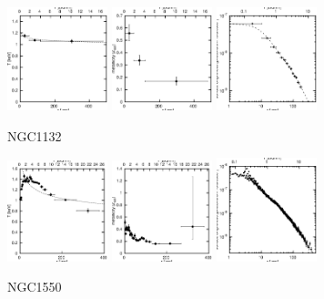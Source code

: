\documentclass[structabstract]{aa}
\begin{document}
\begin{figure}[h]
   \centering
   \includegraphics[width=0.26\textwidth]{tprofile_ngc1132.eps}
   \includegraphics[width=0.26\textwidth]{zprofile_ngc1132.eps}
   \includegraphics[width=0.26\textwidth]{sbps_ngc1132.eps}
  \caption{NGC1132}
   \label{fig:tprofngc1132}%
\end{figure}
\clearpage
\begin{figure}[h]
   \centering
   \includegraphics[width=0.26\textwidth]{tprofile_ngc1550.eps}
   \includegraphics[width=0.26\textwidth]{zprofile_ngc1550.eps}
   \includegraphics[width=0.26\textwidth]{sbps_ngc1550.eps}
   \caption{NGC1550}
   \label{fig:tprofngc1550}%
\end{figure}
\end{document}
